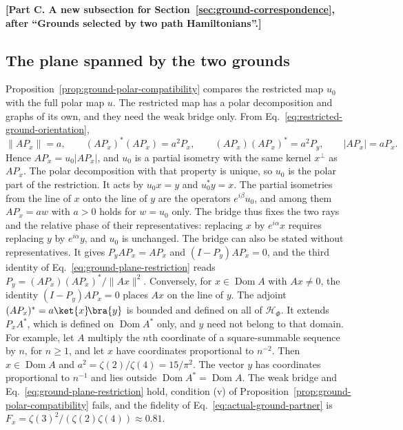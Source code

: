 \par\medskip\noindent\textbf{[Part C. A new subsection for Section~\ref{sec:ground-correspondence}, after ``Grounds selected by two path Hamiltonians''.]}\par\smallskip

\subsection{The plane spanned by the two grounds}
\label{subsec:ground-plane}

Proposition~\ref{prop:ground-polar-compatibility} compares the restricted map $u_0$ with the full polar map $u$. The restricted map has a polar decomposition and graphs of its own, and they need the weak bridge only. From Eq.~\eqref{eq:restricted-ground-orientation},
\begin{equation}
 \|AP_x\|=a,\qquad (AP_x)^*(AP_x)=a^2P_x,\qquad (AP_x)(AP_x)^*=a^2P_y,\qquad |AP_x|=aP_x .
 \label{eq:ground-plane-restriction}
\end{equation}
Hence $AP_x=u_0|AP_x|$, and $u_0$ is a partial isometry with the same kernel $x^\perp$ as $AP_x$. The polar decomposition with that property is unique, so $u_0$ is the polar part of the restriction. It acts by $u_0x=y$ and $u_0^*y=x$. The partial isometries from the line of $x$ onto the line of $y$ are the operators $e^{i\beta}u_0$, and among them $AP_x=aw$ with $a>0$ holds for $w=u_0$ only. The bridge thus fixes the two rays and the relative phase of their representatives: replacing $x$ by $e^{i\alpha}x$ requires replacing $y$ by $e^{i\alpha}y$, and $u_0$ is unchanged. The bridge can also be stated without representatives. It gives $P_yAP_x=AP_x$ and $(I-P_y)AP_x=0$, and the third identity of Eq.~\eqref{eq:ground-plane-restriction} reads $P_y=(AP_x)(AP_x)^*/\|Ax\|^2$. Conversely, for $x\in\operatorname{Dom}A$ with $Ax\ne0$, the identity $(I-P_y)AP_x=0$ places $Ax$ on the line of $y$. The adjoint $(AP_x)^*=a\ket{x}\!\bra{y}$ is bounded and defined on all of $\mathcal H_\Phi$. It extends $P_xA^*$, which is defined on $\operatorname{Dom}A^*$ only, and $y$ need not belong to that domain. For example, let $A$ multiply the $n$th coordinate of a square-summable sequence by $n$, for $n\geq1$, and let $x$ have coordinates proportional to $n^{-2}$. Then $x\in\operatorname{Dom}A$ and $a^2=\zeta(2)/\zeta(4)=15/\pi^2$. The vector $y$ has coordinates proportional to $n^{-1}$ and lies outside $\operatorname{Dom}A^*=\operatorname{Dom}A$. The weak bridge and Eq.~\eqref{eq:ground-plane-restriction} hold, condition (v) of Proposition~\ref{prop:ground-polar-compatibility} fails, and the fidelity of Eq.~\eqref{eq:actual-ground-partner} is $F_x=\zeta(3)^2/(\zeta(2)\zeta(4))\approx0.81$.

